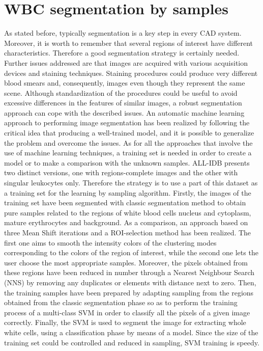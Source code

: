 {	\section{WBC segmentation by samples} 
	\label{iciap_caip_2015}
	As stated before, typically segmentation is a key step in every CAD system. Moreover, it is worth to remember that several regions of interest have different characteristics. Therefore a good segmentation strategy is certainly needed.
	Further issues addressed are that images are acquired with various acquisition devices and staining techniques. Staining procedures could produce very different blood smears and, consequently, images even though they represent the same scene. Although standardization of the procedures could be useful to avoid excessive differences in the features of similar images, a robust segmentation approach can cope with the described issues. An automatic machine learning approach to performing image segmentation has been realized by following the critical idea that producing a well-trained model, and it is possible to generalize the problem and overcome the issues. As for all the approaches that involve the use of machine learning techniques, a training set is needed in order to create a model or to make a comparison with the unknown samples. ALL-IDB presents two distinct versions, one with regions-complete images and the other with singular leukocytes only. Therefore the strategy is to use a part of this dataset as a training set for the learning by sampling algorithm. Firstly, the images of the training set have been segmented with classic segmentation method to obtain pure samples related to the regions of white blood cells nucleus and cytoplasm, mature erythrocytes and background. As a comparison, an approach based on three Mean Shift iterations and a ROI-selection method has been realized. The first one aims to smooth the intensity colors of the clustering modes corresponding to the colors of the region of interest, while the second one lets the user choose the most appropriate samples.
	Moreover, the pixels obtained from these regions have been reduced in number through a Nearest Neighbour Search (NNS) by removing any duplicates or elements with distance next to zero. Then, the training samples have been prepared by adapting sampling from the regions obtained from the classic segmentation phase so as to perform the training process of a multi-class SVM in order to classify all the pixels of a given image correctly. Finally, the SVM is used to segment the image for extracting whole white cells, using a classification phase by means of a model. Since the size of the training set could be controlled and reduced in sampling, SVM training is speedy.
	
}
